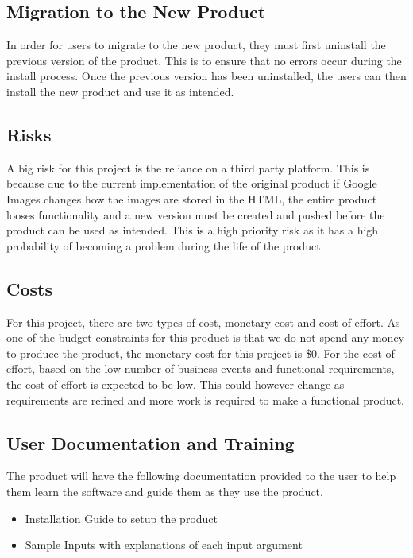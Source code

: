 \documentclass[12pt, titlepage]{article}
\begin{document}
\subsection{Migration to the New Product}

In order for users to migrate to the new product, they must first uninstall the previous version of the product. This is to ensure that no errors occur during the install process. Once the previous version has been uninstalled, the users can then install the new product and use it as intended.

\subsection{Risks}

A big risk for this project is the reliance on a third party platform. This is because due to the current implementation of the original product if Google Images changes how the images are stored in the HTML, the entire product looses functionality and a new version must be created and pushed before the product can be used as intended. This is a high priority risk as it has a high probability of becoming a problem during the life of the product.

\subsection{Costs}

For this project, there are two types of cost, monetary cost and cost of effort. As one of the budget constraints for this product is that we do not spend any money to produce the product, the monetary cost for this project is \$0. For the cost of effort, based on the low number of business events and functional requirements, the cost of effort is expected to be low. This could however change as requirements are refined and more work is required to make a functional product.

\subsection{User Documentation and Training}

The product will have the following documentation provided to the user to help them learn the software and guide them as they use the product.

\begin{itemize}
    \item Installation Guide to setup the product
    \item Sample Inputs with explanations of each input argument
\end{itemize}
\end{document}
